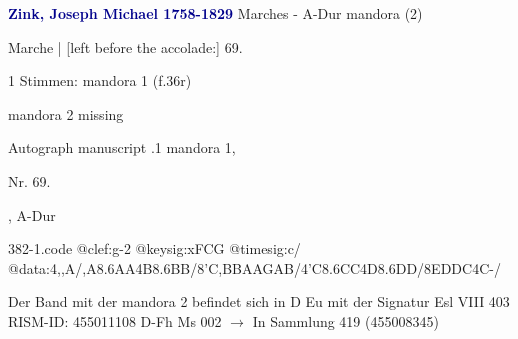 \documentclass[twocolumn]{book}
\begin{document}
\newline \par \vspace{7pt} \textcolor{darkblue}{\textbf{Zink, Joseph Michael  1758-1829}}
\newline Marches - A-Dur
\newline mandora (2)
\newline \begin{itshape}[f.36r, at left:] Marche | [left before the accolade:] 69.\end{itshape} 
\newline \textcolor{darkblue}{}  1 Stimmen: mandora 1  (f.36r)
\newline \begin{small} mandora 2 missing\end{small} 
\newline Autograph manuscript
.1  mandora 1, \begin{itshape}Nr. 69.\end{itshape}, A-Dur  
\begin{filecontents*}{382-1.code}
@clef:g-2
@keysig:xFCG
@timesig:c/
@data:4,,A/,A{8.6AA}4B{8.6BB}/8'C,BBAAGAB/4'C{8.6CC}4D{8.6DD}/8EDDC4C-/
\end{filecontents*}
\newline
%
\newline Der Band mit der mandora 2 befindet sich in D Eu mit der Signatur Esl VIII 403
\newline RISM-ID: 455011108
\newline D-Fh  Ms 002
\newline $\rightarrow$ In Sammlung 419 (455008345)
      
\end{document}
